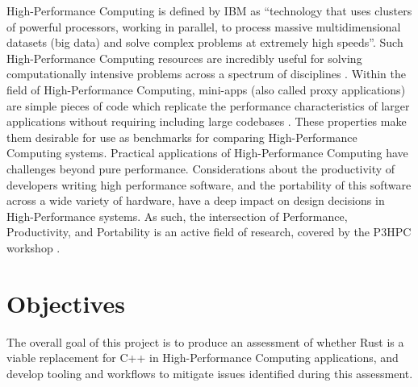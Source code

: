 High-Performance Computing is defined by IBM as ``technology that uses clusters of powerful processors, working in parallel, to process massive multidimensional datasets (big data) and solve complex problems at extremely high speeds''\cite{WhatHPCIntroduction}. Such High-Performance Computing resources are incredibly useful for solving computationally intensive problems across a spectrum of disciplines \cite{JournalDescriptionInternational}.
Within the field of High-Performance Computing, mini-apps (also called proxy applications) are simple pieces of code which replicate the performance characteristics of larger applications without requiring including large codebases \cite{heroux2013mantevo}. These properties make them desirable for use as benchmarks for comparing High-Performance Computing systems.
Practical applications of High-Performance Computing have challenges beyond pure performance. Considerations about the productivity of developers writing high performance software, and the portability of this software across a wide variety of hardware, have a deep impact on design decisions in High-Performance systems. As such, the intersection of Performance, Productivity, and Portability is an active field of research, covered by the P3HPC workshop \cite{P3HPC}.



\section{Objectives}
\label{sec:objectives}

The overall goal of this project is to produce an assessment of whether Rust is a viable replacement for C++ in High-Performance Computing applications, and develop tooling and workflows to mitigate issues identified during this assessment.

